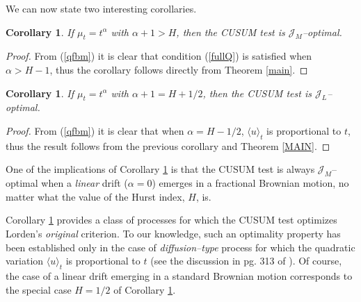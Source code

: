 \documentclass[11pt,reqno]{amsart}
\newtheorem{corollary}[theorem]{Corollary}
\theoremstyle{remark}
\begin{document}
We can now state two interesting corollaries. 

\begin{corollary}   \label{coro1}
If $\mu_{t}=t^{\alpha}$ with $\alpha+1>H$, then the CUSUM test  is ${\mathcal{J}}_{M}$--optimal. 
\end{corollary}

\begin{proof}
From (\ref{qfbm}) it is clear that condition (\ref{fullQ}) is satisfied when  $\alpha>H-1$, thus the corollary follows directly from Theorem \ref{main}.
\end{proof}

\begin{corollary}  \label{coro2}
If $\mu_{t}=t^{\alpha}$ with $\alpha+1=H+1/2$, then  the CUSUM test is ${\mathcal{J}}_{L}$--optimal. 
\end{corollary}

\begin{proof}
From (\ref{qfbm}) it is clear that when $\alpha=H-1/2$,  $\langle u \rangle_{t}$ is proportional to $t$, thus the result follows from the previous corollary and Theorem \ref{MAIN}.
\end{proof}

One of the implications of Corollary \ref{coro1} is that the CUSUM test is always ${\mathcal{J}}_{M}$--optimal when a  \textit{linear} drift ($\alpha=0$) emerges in a fractional Brownian motion, no matter what the value of the Hurst index, $H$, is. 

Corollary \ref{coro2}  provides a class of processes for which the CUSUM test optimizes  Lorden's \textit{original} criterion. To our knowledge, such an optimality property has been established only in the case of \textit{diffusion--type} process for which the quadratic variation $\langle u \rangle _{t}$ is proportional to $t$ (see the discussion in pg. 313 of \cite{moustito}). Of course, the case of a linear drift emerging in a standard Brownian motion corresponds to the special case $H=1/2$ of Corollary \ref{coro2}. 
\end{document}
